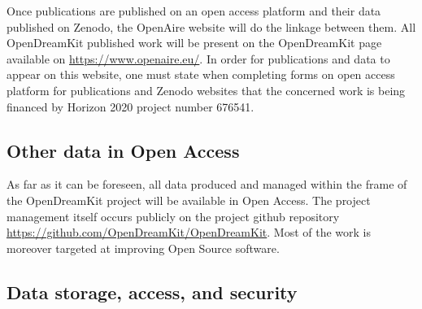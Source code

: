 \documentclass{deliverablereport}
\begin{document}
Once publications are published on an open access platform and their data published on Zenodo, the OpenAire website will do the linkage between them. All OpenDreamKit published work will be present on the OpenDreamKit page available on \href{https://www.openaire.eu/}{https://www.openaire.eu/}.
In order for publications and data to appear on this website, one must state when completing forms on open access platform for publications and Zenodo websites that the concerned work is being financed by Horizon 2020 project number 676541.



\subsection{Other data in Open Access}


As far as it can be foreseen, all data produced and managed within the
frame of the OpenDreamKit project will be available in Open Access. The
project management itself occurs publicly on the project github
repository \url{https://github.com/OpenDreamKit/OpenDreamKit}. Most of
the work is moreover targeted at improving Open Source software.

\subsection{Data storage, access, and security}
\end{document}
